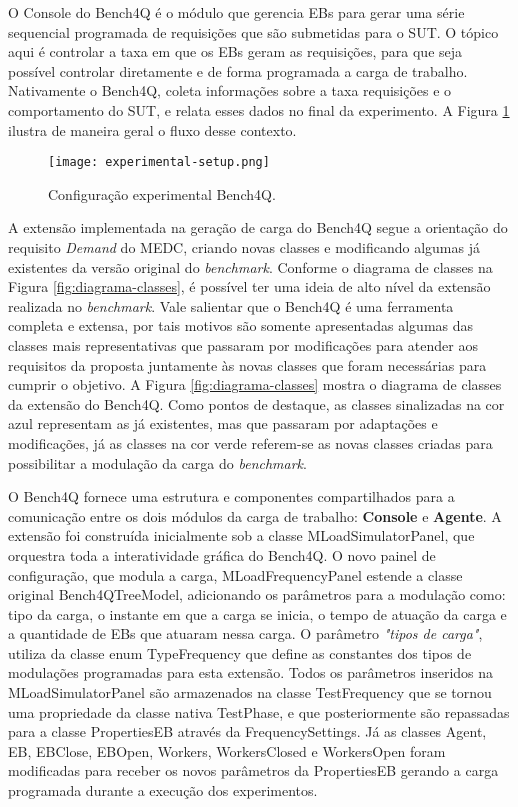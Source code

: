 O Console do Bench4Q é o módulo que gerencia EBs para gerar uma série sequencial programada de requisições que são submetidas para o SUT. O tópico aqui é controlar a taxa em que os EBs geram as requisições, para que seja possível controlar diretamente e de forma programada a carga de trabalho. Nativamente o Bench4Q, coleta informações sobre a taxa requisições e o comportamento do SUT, e relata esses dados no final da experimento. A Figura \ref{fig:experimental-setup} ilustra de maneira geral o fluxo desse contexto.

\begin{figure}[!htb]
	\centering
	\texttt{[image: experimental-setup.png]}	
	\caption{Configuração experimental Bench4Q.}
	\label{fig:experimental-setup}
\end{figure}

A extensão implementada na geração de carga do Bench4Q segue a orientação do requisito \textit{Demand} do MEDC, criando novas classes e modificando algumas já existentes da versão original do \textit{benchmark}. Conforme o diagrama de classes na Figura \ref{fig:diagrama-classes}, é possível ter uma ideia de alto nível da extensão realizada no \textit{benchmark}. Vale salientar que o Bench4Q é uma ferramenta completa e extensa, por tais motivos são somente apresentadas algumas das classes mais representativas que passaram por modificações para atender aos requisitos da proposta juntamente às novas classes que foram necessárias para cumprir o objetivo. A Figura \ref{fig:diagrama-classes} mostra o diagrama de classes da extensão do Bench4Q. Como pontos de destaque, as classes sinalizadas na cor azul representam as já existentes, mas que passaram por adaptações e modificações, já as classes na cor verde referem-se as novas classes criadas para possibilitar a modulação da carga do \textit{benchmark}.

O Bench4Q fornece uma estrutura e componentes compartilhados para a comunicação entre os dois módulos da carga de trabalho: \textbf{Console} e \textbf{Agente}. A extensão foi construída inicialmente sob a classe \textsf{MLoadSimulatorPanel}, que orquestra toda a interatividade gráfica do Bench4Q. O novo painel de configuração, que modula a carga, \textsf{MLoadFrequencyPanel} estende a classe original \textsf{Bench4QTreeModel}, adicionando os parâmetros para a modulação como: tipo da carga, o instante em que a carga se inicia, o tempo de atuação da carga e a quantidade de EBs que atuaram nessa carga. O parâmetro \textit{"tipos de carga"}, utiliza da classe enum \textsf{TypeFrequency} que define as constantes dos tipos de modulações programadas para esta extensão.  Todos os parâmetros inseridos na \textsf{MLoadSimulatorPanel} são armazenados na classe \textsf{TestFrequency} que se tornou uma propriedade da classe nativa \textsf{TestPhase}, e que posteriormente são repassadas para a classe \textsf{PropertiesEB} através da \textsf{FrequencySettings}. Já as classes \textsf{Agent}, \textsf{EB}, \textsf{EBClose}, \textsf{EBOpen}, \textsf{Workers}, \textsf{WorkersClosed} e \textsf{WorkersOpen} foram modificadas para receber os novos parâmetros da \textsf{PropertiesEB} gerando a carga programada durante a execução dos experimentos.

